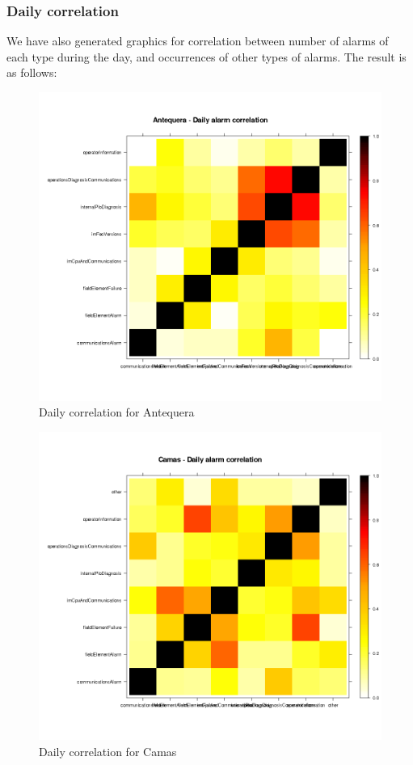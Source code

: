 \documentclass[a4paper,10pt]{article}
\begin{document}
\clearpage

\subsubsection{Daily correlation}

We have also generated graphics for correlation between number of alarms of each type during the day, and occurrences of other types of alarms. The result is as follows:

\begin{figure}[h!]
 \centering
 \includegraphics[height=0.4\textheight]{./img/antequera_correlation.png}
 \caption{Daily correlation for Antequera}
 \label{fig:anteq}
\end{figure}
\begin{figure}[h!]
 \centering
 \includegraphics[height=0.4\textheight]{./img/camas_correlation.png}
 \caption{Daily correlation for Camas}
 \label{fig:camas}
\end{figure}
\end{document}
